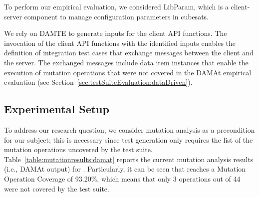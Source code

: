 To perform our empirical evaluation, we considered LibParam, which is a client-server component to manage configuration parameters in cubesats.

We rely on DAMTE to generate inputs for the \PARAM client API functions. The invocation of the \PARAM client API functions with the identified inputs enables the definition of integration test cases that exchange messages between the \PARAM client and the \PARAM server. The exchanged messages include data item instances that enable the execution of mutation operations that were not covered in the DAMAt empirical evaluation (see Section~\ref{sec:testSuiteEvaluation:dataDriven}).

\subsection{Experimental Setup}

To address our research question, we consider mutation analysis as a precondition for our subject; this is necessary since test generation only requires the list of the mutation operations uncovered by the test suite. Table~\ref{table:mutationresults:damat} reports the current mutation analysis results (i.e., DAMAt output) for \PARAM.
Particularly, it can be seen that \PARAM reaches a Mutation Operation Coverage of 93.20\%, which means that only 3 operations out of 44 were not covered by the test suite.

